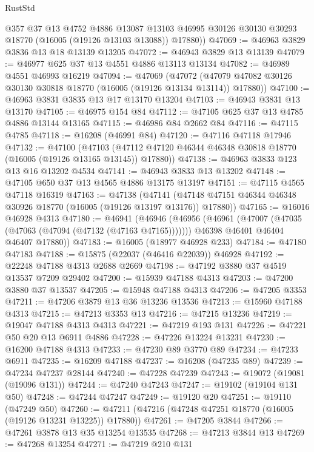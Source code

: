 \begin{lexlean}{RustStd}
\begin{coremodule}
        @357
        @37
        @13
        @4752
        @4886
        @13087
        @13103
        @46995
        @30126
        @30130
        @30293
        @18770
        (@16005 (@19126 @13103 @13088))
        @17880))
@47069 := @46963 @3829 @3836 @13 @18 @13139 @13205
@47072 := @46943 @3829 @13 @13139
@47079 := @46977 @625 @37 @13 @4551 @4886 @13113 @13134
@47082 := @46989 @4551 @46993 @16219
@47094 := @47069
    (@47072 (@47079 @47082 @30126 @30130 @30818 @18770 (@16005 (@19126 @13134 @13114)) @17880))
@47100 := @46963 @3831 @3835 @13 @17 @13170 @13204
@47103 := @46943 @3831 @13 @13170
@47105 := @46975 @154 @84
@47112 := @47105 @625 @37 @13 @4785 @4886 @13144 @13165
@47115 := @46986 @84 @2662 @84
@47116 := @47115 @4785
@47118 := @16208 (@46991 @84)
@47120 := @47116 @47118 @17946
@47132 := @47100
    (@47103 (@47112 @47120 @46344 @46348 @30818 @18770 (@16005 (@19126 @13165 @13145)) @17880))
@47138 := @46963 @3833 @123 @13 @16 @13202 @4534
@47141 := @46943 @3833 @13 @13202
@47148 := @47105 @650 @37 @13 @4565 @4886 @13175 @13197
@47151 := @47115 @4565 @47118 @16319
@47163 := @47138
    (@47141 (@47148 @47151 @46344 @46348 @30926 @18770 (@16005 (@19126 @13197 @13176)) @17880))
@47165 := @16016 @46928 @4313
@47180 := @46941
    (@46946
      (@46956
        (@46961 (@47007 (@47035 (@47063 (@47094 (@47132 (@47163 @47165)))))))
        @46398
        @46401
        @46404
        @46407
        @17880))
@47183 := @16005 (@18977 @46928 @233)
@47184 := @47180 @47183
@47188 := @15875 (@22037 (@46416 @22039)) @46928
@47192 := @22248 @47188 @4313 @2688 @2669
@47198 := @47192 @3880 @37 @4519 @13537 @7209 @29402
@47200 := @15939 @47188 @4313
@47203 := @47200 @3880 @37 @13537
@47205 := @15948 @47188 @4313
@47206 := @47205 @3353
@47211 := @47206 @3879 @13 @36 @13236 @13536
@47213 := @15960 @47188 @4313
@47215 := @47213 @3353 @13
@47216 := @47215 @13236
@47219 := @19047 @47188 @4313 @4313
@47221 := @47219 @193 @131
@47226 := @47221 @50 @20 @13 @6911 @4886
@47228 := @47226 @13224 @13231
@47230 := @16200 @47188 @4313
@47233 := @47230 @89 @3770 @89
@47234 := @47233 @6911
@47235 := @16209 @47188
@47237 := @16208 (@47235 @89)
@47239 := @47234 @47237 @28144
@47240 := @47228 @47239
@47243 := @19072 (@19081 (@19096 @131))
@47244 := @47240 @47243
@47247 := @19102 (@19104 @131 @50)
@47248 := @47244 @47247
@47249 := @19120 @20
@47251 := @19110 (@47249 @50)
@47260 := @47211 (@47216 (@47248 @47251 @18770 (@16005 (@19126 @13231 @13225)) @17880))
@47261 := @47205 @3844
@47266 := @47261 @3878 @13 @35 @13254 @13535
@47268 := @47213 @3844 @13
@47269 := @47268 @13254
@47271 := @47219 @210 @131

\end{coremodule}
\end{lexlean}
